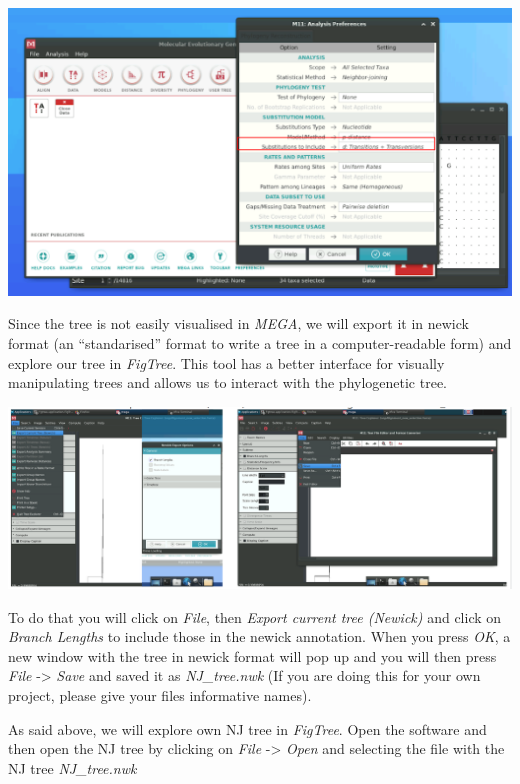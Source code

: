 \documentclass[
  letterpaper,
]{book}
\begin{document}
\includegraphics{assets/images/chapters/phylogenomics/9.png}

Since the tree is not easily visualised in \emph{MEGA}, we will export
it in newick format (an ``standarised'' format to write a tree in a
computer-readable form) and explore our tree in \emph{FigTree}. This
tool has a better interface for visually manipulating trees and allows
us to interact with the phylogenetic tree.

\includegraphics{assets/images/chapters/phylogenomics/10.png}

To do that you will click on \emph{File}, then \emph{Export current tree
(Newick)} and click on \emph{Branch Lengths} to include those in the
newick annotation. When you press \emph{OK}, a new window with the tree
in newick format will pop up and you will then press \emph{File}
-\textgreater{} \emph{Save} and saved it as \emph{NJ\_tree.nwk} (If you
are doing this for your own project, please give your files informative
names).

As said above, we will explore own NJ tree in \emph{FigTree}. Open the
software and then open the NJ tree by clicking on \emph{File}
-\textgreater{} \emph{Open} and selecting the file with the NJ tree
\emph{NJ\_tree.nwk}
\end{document}
